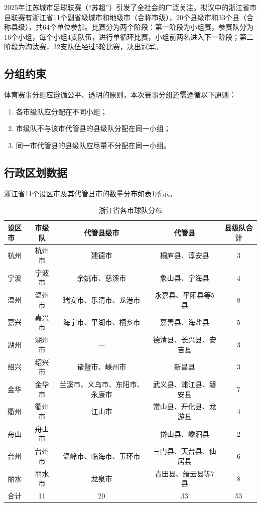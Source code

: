 \documentclass[12pt,a4paper]{article}
\begin{document}
2025年江苏城市足球联赛（“苏超”）引发了全社会的广泛关注。拟议中的浙江省市县联赛有浙江省11个副省级城市和地级市（合称市级），20个县级市和33个县（合称县级），共64个单位参加。比赛分为两个阶段：第一阶段为小组赛，参赛队分为16个小组，每个小组4支队伍，进行单循环比赛，小组前两名进入下一阶段；第二阶段为淘汰赛，32支队伍经过5轮比赛，决出冠军。

\subsection{分组约束}

体育赛事分组应遵循公平、透明的原则，本次赛事分组还需遵循以下原则：

{\renewcommand{\labelenumi}{(\textbf{C\arabic{enumi}})}
  \begin{enumerate}
    \item 各市级队应分配在不同小组；
    \item 市级队不与该市代管县的县级队分配在同一小组；
    \item 同一市代管县的县级队应尽量不分配在同一小组。
\end{enumerate}}

\subsection{行政区划数据}

浙江省11个设区市及其代管县市的数量分布如表\ref{tab:city_data}所示。

\begin{table}[H]
  \centering
  \caption{浙江省各市球队分布}
  \label{tab:city_data}
  \small
  \setlength{\tabcolsep}{3pt}
  \begin{tabular}{lcccc}
    \toprule
    设区市 & 市级队 & 代管县级市 & 代管县 & 县级队合计 \\
    \midrule
    杭州 & 杭州市 & 建德市 & 桐庐县、淳安县 & 3 \\
    宁波 & 宁波市 & 余姚市、慈溪市 & 象山县、宁海县 & 4 \\
    温州 & 温州市 & 瑞安市、乐清市、龙港市 & 永嘉县、平阳县等5县 & 8 \\
    嘉兴 & 嘉兴市 & 海宁市、平湖市、桐乡市 & 嘉善县、海盐县 & 5 \\
    湖州 & 湖州市 & — & 德清县、长兴县、安吉县 & 3 \\
    绍兴 & 绍兴市 & 诸暨市、嵊州市 & 新昌县 & 3 \\
    金华 & 金华市 & 兰溪市、义乌市、东阳市、永康市 & 武义县、浦江县、磐安县 & 7 \\
    衢州 & 衢州市 & 江山市 & 常山县、开化县、龙游县 & 4 \\
    舟山 & 舟山市 & — & 岱山县、嵊泗县 & 2 \\
    台州 & 台州市 & 温岭市、临海市、玉环市 & 三门县、天台县、仙居县 & 6 \\
    丽水 & 丽水市 & 龙泉市 & 青田县、缙云县等7县 & 8 \\
    \midrule
    合计 & 11 & 20 & 33 & 53 \\
    \bottomrule
  \end{tabular}
\end{table}
\end{document}
